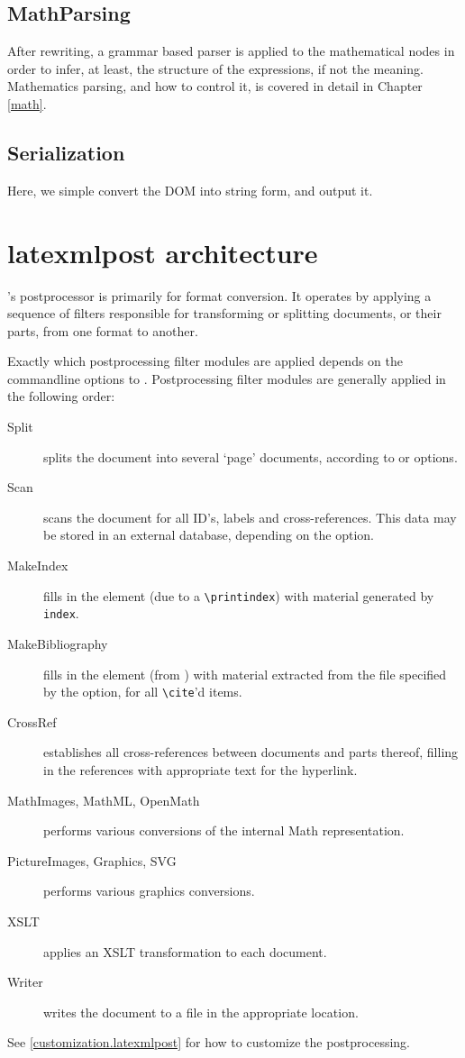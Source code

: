 \documentclass{book}
\begin{document}
\subsection{MathParsing}\label{architecture.mathparsing}
After rewriting, a grammar based parser is applied to the mathematical
nodes in order to infer, at least, the structure of the expressions,
if not the meaning.
Mathematics parsing, and how to control it, is covered in detail in Chapter \ref{math}.

\subsection{Serialization}\label{architecture.serialization}
Here, we simple convert the DOM into string form, and output it.

\section{latexmlpost architecture}\label{latexmlpostarchitecture}
\LaTeXML's postprocessor is primarily for format conversion.
It operates by applying a sequence of filters responsible for
transforming or splitting documents, or their parts, from one format to another.

Exactly which postprocessing filter modules are applied depends
on the commandline options to .
Postprocessing filter modules are generally applied in the following order:
\begin{description}
  \item[Split] splits the document into several `page' documents,
   according to  or  options.
  \item[Scan] scans the document for all ID's, labels and cross-references.
    This data may be stored in an external database,  depending on the  option.
  \item[MakeIndex] fills in the  element (due to a \verb|\printindex|)
   with material generated by \verb|index|.
  \item[MakeBibliography] fills in the  element
   (from \verb||) with material extracted from the
   file specified by the  option, for all \verb|\cite|'d items.
  \item[CrossRef] establishes all cross-references between documents and
   parts thereof, filling in the references with appropriate text for the hyperlink.
  \item[MathImages, MathML, OpenMath] performs various conversions of the
   internal Math representation.
  \item[PictureImages, Graphics, SVG] performs various graphics conversions.
  \item[XSLT] applies an XSLT transformation to each document.
  \item[Writer] writes the document to a file in the appropriate location.
\end{description}
See \ref{customization.latexmlpost} for how to customize the postprocessing.
\end{document}
